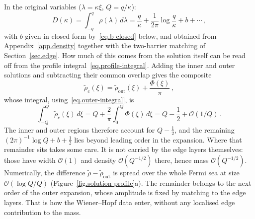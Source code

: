 \documentclass[11pt,a4paper]{article}
\theoremstyle{definition}
\begin{document}
In the original variables ($\lambda = \kappa\xi$, $Q = q/\kappa$):
\begin{equation}\label{eq.density-physical}
  D(\kappa) = \int_{-q}^{q}\rho(\lambda)\,d\lambda
  = \frac{q}{\kappa} + \frac{1}{2\pi}\log\frac{q}{\kappa}
  + b + \cdots\,,
\end{equation}
with $b$ given in closed form by~\eqref{eq.b-closed} below, and obtained from
Appendix~\ref{app.density} together with the two-barrier matching of
Section~\ref{sec.edge}.
How much of this comes from the solution itself can be read off from
the profile integral~\eqref{eq.profile-integral}.  Adding the inner and outer
solutions and subtracting their common overlap gives the composite
\begin{equation}\label{eq.composite}
  \tilde\rho_c(\xi) = \tilde\rho_{\mathrm{out}}(\xi) + \frac{\Phi(\xi)}{\pi}\,,
\end{equation}
whose integral, using~\eqref{eq.outer-integral}, is
\begin{equation}\label{eq.inner-half}
  \int_{-Q}^{Q}\tilde\rho_c(\xi)\,d\xi
  = Q + \frac{2}{\pi}\int_0^{Q}\Phi(\xi)\,d\xi
  = Q - \frac{1}{2} + \mathcal O(1/Q)\,.
\end{equation}
The inner and outer regions therefore account for $Q - \frac12$, and the
remaining $(2\pi)^{-1}\log Q + b + \frac12$ lies beyond leading order in the
expansion.  Where that remainder sits takes some care.
It is not carried by the edge layers themselves: those have width
$\mathcal O(1)$ and density $\mathcal O(Q^{-1/2})$ there, hence mass
$\mathcal O(Q^{-1/2})$.  Numerically, the difference
$\tilde\rho - \tilde\rho_{\mathrm{out}}$ is spread over the whole Fermi sea at
size $\mathcal O(\log Q/Q)$ (Figure~\ref{fig.solution-profile}a).  The remainder
belongs to the next order of the outer expansion, whose amplitude is fixed by
matching to the edge layers.  That is how the Wiener--Hopf data enter, without
any localised edge contribution to the mass.
\end{document}
